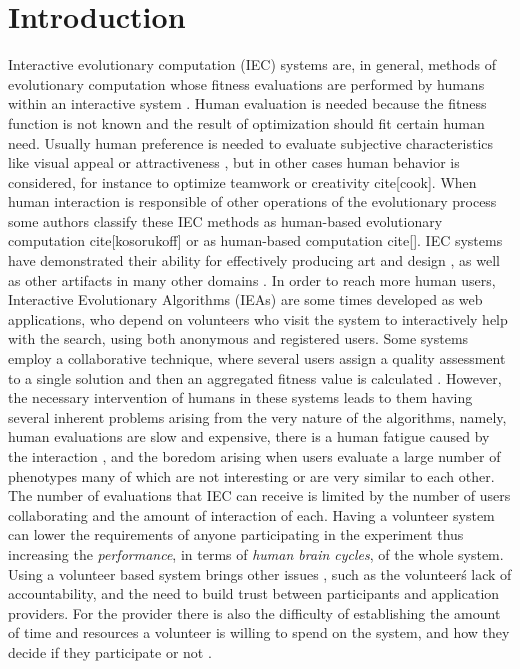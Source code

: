 \section{Introduction}
Interactive evolutionary computation (IEC) systems are, in general, methods
of evolutionary computation whose fitness evaluations are performed by humans 
within an interactive system \cite{eiben2015interactive}.  Human evaluation 
is needed because the fitness function is not known and the result
of optimization should fit certain human need. Usually human preference is
needed to evaluate subjective characteristics like visual appeal or 
attractiveness \cite{biomorphs}, but in other cases human behavior is 
considered, for instance to optimize teamwork \cite{kosorukoff2002evolutionary}
or creativity cite[cook]. When human interaction is responsible of other 
operations of the evolutionary process some authors classify these IEC methods 
as human-based evolutionary computation cite[kosorukoff] or as human-based computation cite[].
IEC systems have demonstrated their ability for effectively
producing art and design \cite{Bentley:1999:intro,Sims:1991,todd:1992,evoeco},
as well as other artifacts in many other domains \cite{ie1}. 
In order to reach more human users, Interactive Evolutionary Algorithms (IEAs) are
some times developed as web applications,
who depend on volunteers who visit the system to interactively help
with the search, using both anonymous and registered users. Some systems 
employ a collaborative technique, where several users assign a quality assessment 
to a single solution and then an aggregated fitness value is calculated 
\cite{picbreeder,seyama2016development,wagy2014collective}.
However, the necessary intervention of humans in these systems leads
to them having several inherent problems arising from the very nature of 
the algorithms, namely, human evaluations are slow and expensive, there is a
human fatigue caused by the interaction \cite{ie1}, and
the boredom arising when users evaluate a large number of phenotypes 
many of which are not interesting or are very similar to each other. 
The number of evaluations that IEC can receive is limited by the number of users
collaborating and the amount of interaction of each. Having a volunteer system 
can lower the requirements of anyone participating in
the experiment thus increasing the {\em performance}, in terms of {\em
human brain cycles}, of the whole system. Using a volunteer based system  
brings other issues \cite{sarmenta2001volunteer,web:BOINC}, 
such as the volunteer\'s lack of accountability,
and the need to build trust between participants and application providers. 
For the provider there is also the difficulty of establishing 
the amount of time and resources
a volunteer is willing to spend on the system, and how they decide if they
participate or not \cite{JJ:2016}. 

